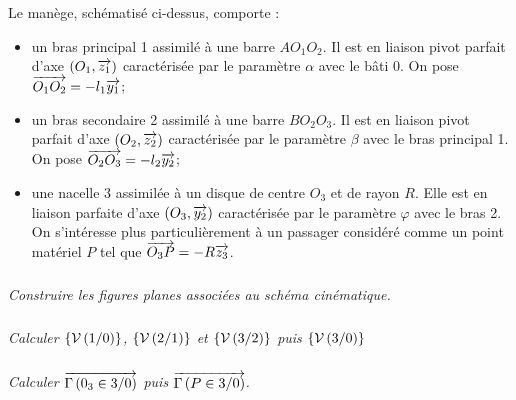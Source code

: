 \documentclass[10pt,oneside]{article}
\begin{document}
Le manège, schématisé ci-dessus, comporte :
\begin{itemize}
\item un bras principal 1 assimilé à une barre $AO_1O_2$. Il est en liaison pivot parfait d'axe $(O_1,\overrightarrow{z_1})$ caractérisée par le paramètre $\alpha$ avec le bâti 0. On pose $\overrightarrow{O_1O_2}=-l_1\overrightarrow{y_1}$;
\item un bras secondaire 2 assimilé à une barre $BO_2O_3$. Il est en liaison pivot parfait d'axe $(O_2,\overrightarrow{z_2})$ caractérisée par le paramètre $\beta$ avec le bras principal 1. On pose $\overrightarrow{O_2O_3}=-l_2\overrightarrow{y_2}$;
\item une nacelle 3 assimilée à un disque de centre $O_3$ et de rayon $R$. Elle est en liaison parfaite d'axe $(O_3,\overrightarrow{y_2})$ caractérisée par le paramètre $\varphi$ avec le bras 2. On s'intéresse plus particulièrement à un passager considéré comme un point matériel $P$ tel que $\overrightarrow{O_3P}=-R\overrightarrow{z_3}$.
\end{itemize}
\subparagraph{}
\textit{Construire les figures planes associées au schéma cinématique.}

\subparagraph{}
\textit{Calculer $\left\{\mathcal{V} \left(1/0 \right) \right\}$, $\left\{\mathcal{V} \left(2/1 \right) \right\}$ et $\left\{\mathcal{V} \left(3/2 \right) \right\}$ puis $\left\{\mathcal{V} \left(3/0 \right) \right\}$}

\subparagraph{}
\textit{Calculer $\overrightarrow{\Gamma \left( {0_3} \in {3}/{0}\right)}$ puis $\overrightarrow{\Gamma \left( {P} \in {3}/{0}\right)}$.}
\end{document}
